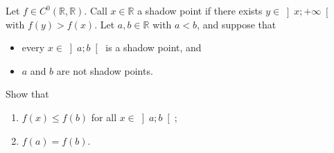 \begin{problem}
    Let \( f \in C^0\left(\mathbb{R},\mathbb{R}\right) \). Call \( x \in \mathbb{R} \) a shadow point if there exists \( y \in \left]x;+\infty\right[ \) with \( f\left(y\right) > f\left(x\right) \). Let \( a, b \in \mathbb{R} \) with \( a < b \), and suppose that
    \begin{itemize}
        \item every \( x \in \left]a;b\right[ \) is a shadow point, and
        \item \( a \) and \( b \) are not shadow points.
    \end{itemize}
    Show that
    \begin{enumerate}
        \item[(a)] \( f\left(x\right) \leq f\left(b\right) \) for all \( x \in \left]a;b\right[ \);
        \item[(b)] \( f\left(a\right) = f\left(b\right) \).
    \end{enumerate}
\end{problem}
